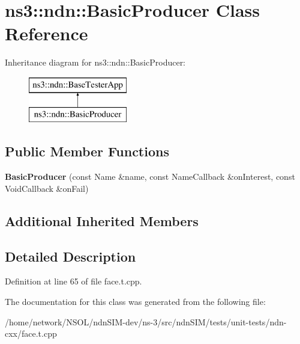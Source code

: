 \hypertarget{classns3_1_1ndn_1_1BasicProducer}{}\section{ns3\+:\+:ndn\+:\+:Basic\+Producer Class Reference}
\label{classns3_1_1ndn_1_1BasicProducer}
Inheritance diagram for ns3\+:\+:ndn\+:\+:Basic\+Producer\+:\begin{figure}[H]
\begin{center}
\leavevmode
\includegraphics[height=2.000000cm]{classns3_1_1ndn_1_1BasicProducer}
\end{center}
\end{figure}
\subsection*{Public Member Functions}
\begin{DoxyCompactItemize}
\item 
{\bfseries Basic\+Producer} (const Name \&name, const Name\+Callback \&on\+Interest, const Void\+Callback \&on\+Fail)\hypertarget{classns3_1_1ndn_1_1BasicProducer_a6978af9a945d3af949311763076eddb4}{}\label{classns3_1_1ndn_1_1BasicProducer_a6978af9a945d3af949311763076eddb4}

\end{DoxyCompactItemize}
\subsection*{Additional Inherited Members}


\subsection{Detailed Description}


Definition at line 65 of file face.\+t.\+cpp.



The documentation for this class was generated from the following file\+:\begin{DoxyCompactItemize}
\item 
/home/network/\+N\+S\+O\+L/ndn\+S\+I\+M-\/dev/ns-\/3/src/ndn\+S\+I\+M/tests/unit-\/tests/ndn-\/cxx/face.\+t.\+cpp\end{DoxyCompactItemize}
